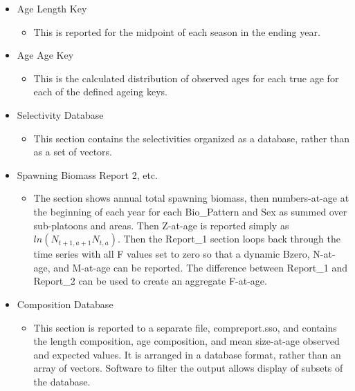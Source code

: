 \begin{itemize}
	\item Age Length Key
	\begin{itemize}
		\item This is reported for the midpoint of each season in the ending year.
	\end{itemize}
	\item Age Age Key
	\begin{itemize}
		\item This is the calculated distribution of observed ages for each true age for each of the defined ageing keys.
	\end{itemize}
	\item Selectivity Database
	\begin{itemize}
		\item This section contains the selectivities organized as a database, rather than as a set of vectors.
	\end{itemize}
	\item Spawning Biomass Report 2, etc.
	\begin{itemize}
		\item The section shows annual total spawning biomass, then numbers-at-age at the beginning of each year for each Bio\_Pattern and Sex as summed over sub-platoons and areas.  Then Z-at-age is reported simply as $ln(N_{t+1,a+1} N_{t,a})$.  Then the Report\_1 section loops back through the time series with all F values set to zero so that a dynamic Bzero, N-at-age, and M-at-age can be reported.  The difference between Report\_1 and Report\_2 can be used to create an aggregate F-at-age.
	\end{itemize}
	\item Composition Database
	\begin{itemize}
		\item This section is reported to a separate file, compreport.sso, and contains the length composition, age composition, and mean size-at-age observed and expected values.  It is arranged in a database format, rather than an array of vectors.  Software to filter the output allows display of subsets of the database.
	\end{itemize}
\end{itemize}

\pagebreak
